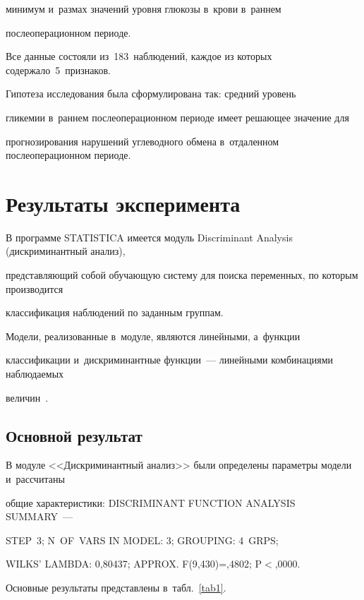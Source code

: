 минимум и~размах значений уровня глюкозы в~крови в~раннем 

послеоперационном периоде.



Все данные состояли из~183~наблюдений, каждое из которых содержало~5~признаков.



Гипотеза исследования была сформулирована так: средний уровень 

гликемии в~раннем послеоперационном периоде имеет решающее значение для 

прогнозирования нарушений углеводного обмена в~отдаленном послеоперационном периоде.



\section{Результаты эксперимента}



В программе STATISTICA имеется модуль Discriminant Analysis (дискриминантный анализ), 

представляющий собой обучающую систему для поиска переменных, по которым производится 

классификация наблюдений по заданным группам.

    Модели, реализованные в~модуле, являются линейными, а~функции 

    классификации и~дискриминантные функции~--- линейными комбинациями наблюдаемых 

    величин~\cite{bureeva}.



\subsection{Основной результат}



В модуле <<Дискриминантный анализ>> были определены параметры модели и~рассчитаны 

общие характеристики: DISCRIMINANT FUNCTION ANALYSIS SUMMARY~---

STEP~3; N~OF~VARS IN MODEL: 3; GROUPING: 4~GRPS;

WILKS' LAMBDA: 0,80437; APPROX. F(9,430)\;=,4802; P\;$<$,0000.



Основные результаты представлены в~табл.~\ref{tab1}.



